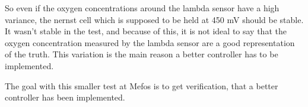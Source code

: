 So even if the oxygen concentrations around the lambda sensor have a high variance, the nernst cell which is supposed to be held at 450 mV should be stable. It wasn't stable in the test, and because of this, it is not ideal to say that the oxygen concentration measured by the lambda sensor are a good representation of the truth. This variation is the main reason a better controller has to be implemented.

The goal with this smaller test at Mefos is to get verification, that a better controller has been implemented.


